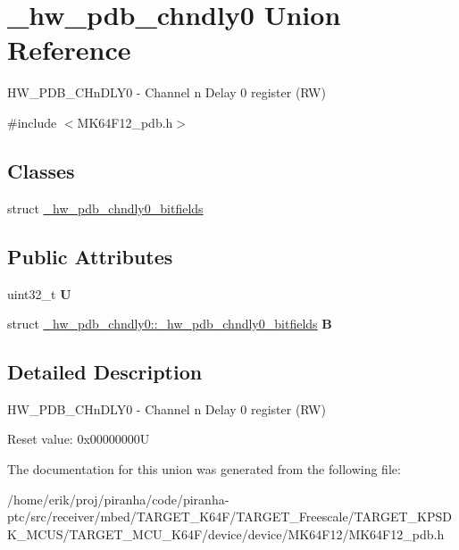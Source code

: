 \hypertarget{union__hw__pdb__chndly0}{}\section{\+\_\+hw\+\_\+pdb\+\_\+chndly0 Union Reference}
\label{union__hw__pdb__chndly0}


H\+W\+\_\+\+P\+D\+B\+\_\+\+C\+Hn\+D\+L\+Y0 -\/ Channel n Delay 0 register (RW)  




{\ttfamily \#include $<$M\+K64\+F12\+\_\+pdb.\+h$>$}

\subsection*{Classes}
\begin{DoxyCompactItemize}
\item 
struct \hyperlink{struct__hw__pdb__chndly0_1_1__hw__pdb__chndly0__bitfields}{\+\_\+hw\+\_\+pdb\+\_\+chndly0\+\_\+bitfields}
\end{DoxyCompactItemize}
\subsection*{Public Attributes}
\begin{DoxyCompactItemize}
\item 
uint32\+\_\+t {\bfseries U}\hypertarget{union__hw__pdb__chndly0_aff947c432db176a34225a99df1b0317e}{}\label{union__hw__pdb__chndly0_aff947c432db176a34225a99df1b0317e}

\item 
struct \hyperlink{struct__hw__pdb__chndly0_1_1__hw__pdb__chndly0__bitfields}{\+\_\+hw\+\_\+pdb\+\_\+chndly0\+::\+\_\+hw\+\_\+pdb\+\_\+chndly0\+\_\+bitfields} {\bfseries B}\hypertarget{union__hw__pdb__chndly0_a41a1cf516a1b4165de5c351ed3726a42}{}\label{union__hw__pdb__chndly0_a41a1cf516a1b4165de5c351ed3726a42}

\end{DoxyCompactItemize}


\subsection{Detailed Description}
H\+W\+\_\+\+P\+D\+B\+\_\+\+C\+Hn\+D\+L\+Y0 -\/ Channel n Delay 0 register (RW) 

Reset value\+: 0x00000000U 

The documentation for this union was generated from the following file\+:\begin{DoxyCompactItemize}
\item 
/home/erik/proj/piranha/code/piranha-\/ptc/src/receiver/mbed/\+T\+A\+R\+G\+E\+T\+\_\+\+K64\+F/\+T\+A\+R\+G\+E\+T\+\_\+\+Freescale/\+T\+A\+R\+G\+E\+T\+\_\+\+K\+P\+S\+D\+K\+\_\+\+M\+C\+U\+S/\+T\+A\+R\+G\+E\+T\+\_\+\+M\+C\+U\+\_\+\+K64\+F/device/device/\+M\+K64\+F12/M\+K64\+F12\+\_\+pdb.\+h\end{DoxyCompactItemize}
